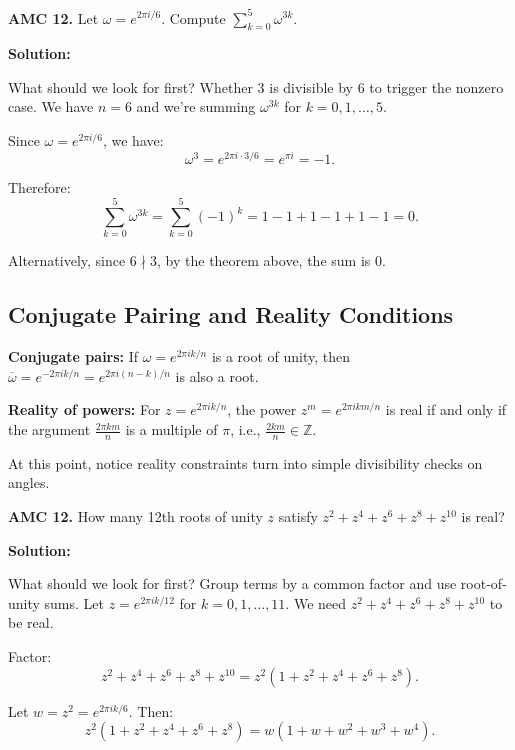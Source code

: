 \documentclass[12pt]{extarticle}
\begin{document}
\begin{examplebox}
\textbf{AMC 12.} Let $\omega = e^{2\pi i/6}$. Compute $\sum_{k=0}^{5} \omega^{3k}$.
\end{examplebox}

\textbf{Solution:}

What should we look for first? Whether $3$ is divisible by $6$ to trigger the nonzero case.
We have $n = 6$ and we're summing $\omega^{3k}$ for $k = 0, 1, \ldots, 5$.

Since $\omega = e^{2\pi i/6}$, we have:
\[
\omega^3 = e^{2\pi i \cdot 3/6} = e^{\pi i} = -1.
\]

Therefore:
\[
\sum_{k=0}^{5} \omega^{3k} = \sum_{k=0}^{5} (-1)^k = 1 - 1 + 1 - 1 + 1 - 1 = 0.
\]

Alternatively, since $6 \nmid 3$, by the theorem above, the sum is 0.


\subsection*{Conjugate Pairing and Reality Conditions}

\textbf{Conjugate pairs:} If $\omega = e^{2\pi ik/n}$ is a root of unity, then $\overline{\omega} = e^{-2\pi ik/n} = e^{2\pi i(n-k)/n}$ is also a root.

\textbf{Reality of powers:} For $z = e^{2\pi ik/n}$, the power $z^m = e^{2\pi ikm/n}$ is real if and only if the argument $\frac{2\pi km}{n}$ is a multiple of $\pi$, i.e., $\frac{2km}{n} \in \mathbb{Z}$.

At this point, notice reality constraints turn into simple divisibility checks on angles.

\begin{examplebox}
\textbf{AMC 12.} How many 12th roots of unity $z$ satisfy $z^2 + z^4 + z^6 + z^8 + z^{10}$ is real?
\end{examplebox}

\textbf{Solution:}

What should we look for first? Group terms by a common factor and use root-of-unity sums.
Let $z = e^{2\pi ik/12}$ for $k = 0, 1, \ldots, 11$. We need $z^2 + z^4 + z^6 + z^8 + z^{10}$ to be real.

Factor:
\[
z^2 + z^4 + z^6 + z^8 + z^{10} = z^2(1 + z^2 + z^4 + z^6 + z^8).
\]

Let $w = z^2 = e^{2\pi ik/6}$. Then:
\[
z^2(1 + z^2 + z^4 + z^6 + z^8) = w(1 + w + w^2 + w^3 + w^4).
\]
\end{document}
